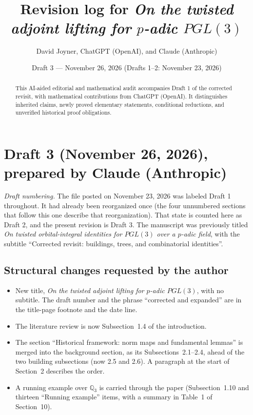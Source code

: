 \documentclass[12pt,letterpaper]{amsart}
\title{Revision log for \emph{On the twisted adjoint lifting for $p$-adic $PGL(3)$}}
\author{David Joyner, ChatGPT (OpenAI), and Claude (Anthropic)}
\date{Draft 3 --- November 26, 2026 (Drafts 1--2: November 23, 2026)}
\begin{document}
\begin{abstract}
This AI-aided editorial and mathematical audit accompanies Draft 1 of the
corrected revisit, with mathematical contributions from ChatGPT (OpenAI).
It distinguishes inherited claims, newly proved elementary statements,
conditional reductions, and unverified historical proof obligations.
\end{abstract}
\maketitle

\section*{Draft 3 (November 26, 2026), prepared by Claude (Anthropic)}

\emph{Draft numbering.} The file posted on November 23, 2026 was
labeled Draft 1 throughout. It had already been reorganized once (the
four unnumbered sections that follow this one describe that
reorganization). That state is counted here as Draft 2, and the present
revision is Draft 3. The manuscript was previously titled \emph{On
twisted orbital-integral identities for $PGL(3)$ over a $p$-adic
field}, with the subtitle ``Corrected revisit: buildings, trees, and
combinatorial identities''.

\subsection*{Structural changes requested by the author}
\begin{itemize}
\item New title, \emph{On the twisted adjoint lifting for $p$-adic $PGL(3)$},
with no subtitle. The draft number and the phrase ``corrected and
expanded'' are in the title-page footnote and the date line.
\item The literature review is now Subsection~1.4 of the introduction.
\item The section ``Historical framework: norm maps and fundamental
lemmas'' is merged into the background section, as its
Subsections~2.1--2.4, ahead of the two building subsections (now 2.5
and 2.6). A paragraph at the start of Section~2 describes the order.
\item A running example over $\mathbb Q_3$ is carried through the
paper (Subsection~1.10 and thirteen ``Running example'' items, with a
summary in Table~1 of Section~10).
\end{itemize}
\end{document}
